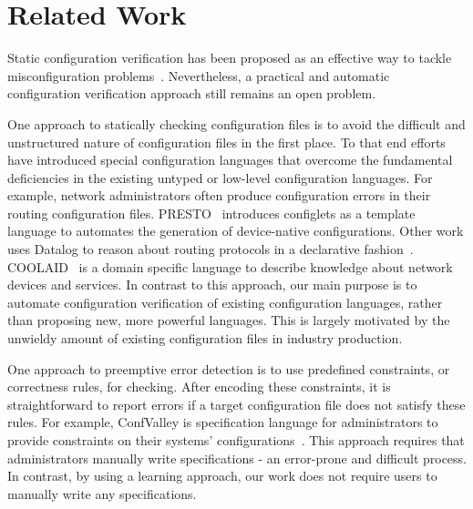 
\section{Related Work}

Static configuration verification has been proposed as an effective way  
to tackle misconfiguration problems~\cite{xu15systems}.
Nevertheless, a practical and automatic configuration
verification approach still remains an open problem.


One approach to statically checking configuration files is to avoid the difficult and unstructured nature of configuration files in the first place.
To that end efforts have introduced special configuration languages that overcome the fundamental deficiencies in the existing untyped or low-level configuration languages. 
For example, network administrators often produce configuration errors in their routing configuration files.
PRESTO~\cite{enck07configuration} introduces configlets as a template language to automates the generation of device-native configurations.
Other work uses Datalog to reason about routing protocols in a declarative fashion~\cite{loo05declarative}. 
COOLAID~\cite{chen10declarative} is a domain specific language to describe knowledge about network devices and services.
In contrast to this approach, our main purpose is to automate configuration verification of existing configuration languages, rather than proposing new, more powerful languages.
This is largely motivated by the unwieldy amount of existing configuration files in industry production.

One approach to preemptive error detection is to use predefined constraints, or correctness rules, for checking.
After encoding these constraints, it is straightforward to report errors if a target configuration file does not satisfy these rules.
For example, ConfValley is specification language for administrators to provide constraints on their systems' configurations~\cite{huang15confvalley}. 
This approach requires that administrators manually write specifications - an error-prone and difficult process. 
In contrast, by using a learning approach, our work does not require users to manually write any specifications.

